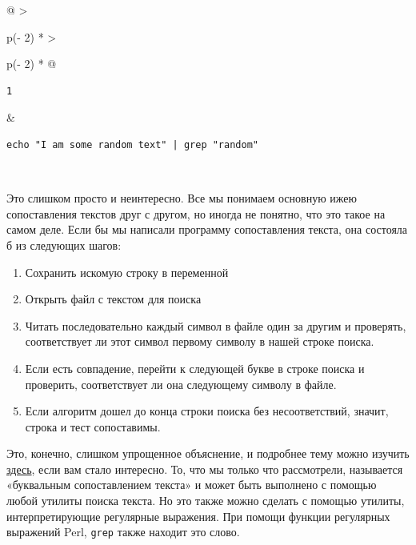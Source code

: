 \documentclass{article}
\begin{document}
\begin{longtable}[]{@{}
  >{\raggedright\arraybackslash}p{(\columnwidth - 2\tabcolsep) * }
  >{\raggedright\arraybackslash}p{(\columnwidth - 2\tabcolsep) * }@{}}
\toprule
\endhead
\begin{minipage}[t]{\linewidth}\raggedright
\begin{verbatim}
1
\end{verbatim}
\end{minipage} & \begin{minipage}[t]{\linewidth}\raggedright
\begin{verbatim}
echo "I am some random text" | grep "random"
\end{verbatim}
\end{minipage} \\ \addlinespace
\bottomrule
\end{longtable}

Это слишком просто и неинтересно. Все мы понимаем основную ижею
сопоставления текстов друг с другом, но иногда не понятно, что это такое
на самом деле. Если бы мы написали программу сопоставления текста, она
состояла б из следующих шагов:

\begin{enumerate}
\tightlist
\item
  Сохранить искомую строку в переменной
\item
  Открыть файл с текстом для поиска
\item
  Читать последовательно каждый символ в файле один за другим и
  проверять, соответствует ли этот символ первому символу в нашей строке
  поиска.
\item
  Если есть совпадение, перейти к следующей букве в строке поиска и
  проверить, соответствует ли она следующему символу в файле.
\item
  Если алгоритм дошел до конца строки поиска без несоответствий, значит,
  строка и тест сопоставимы.
\end{enumerate}

Это, конечно, слишком упрощенное объяснение, и подробнее тему можно
изучить \href{https://stackoverflow.com/a/1627904/7437737}{здесь}, если
вам стало интересно. То, что мы только что рассмотрели, называется
«буквальным сопоставлением текста» и может быть выполнено с помощью
любой утилиты поиска текста. Но это также можно сделать с помощью
утилиты, интерпретирующие регулярные выражения. При помощи функции
регулярных выражений Perl, \texttt{grep} также находит это слово.
\end{document}

